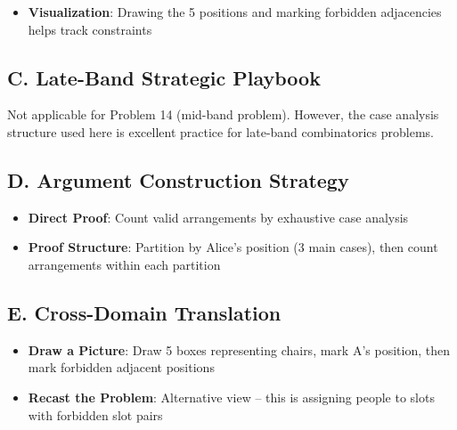 \documentclass[]{article}
\begin{document}
\begin{strategicbox}
\begin{itemize}[leftmargin=*]
    \item \textbf{Visualization}: Drawing the 5 positions and marking forbidden adjacencies helps track constraints
\end{itemize}

\subsection*{C. Late-Band Strategic Playbook}
Not applicable for Problem 14 (mid-band problem). However, the case analysis structure used here is excellent practice for late-band combinatorics problems.

\subsection*{D. Argument Construction Strategy}
\begin{itemize}[leftmargin=*]
    \item \textbf{Direct Proof}: Count valid arrangements by exhaustive case analysis
    \item \textbf{Proof Structure}: Partition by Alice's position (3 main cases), then count arrangements within each partition
\end{itemize}

\subsection*{E. Cross-Domain Translation}
\begin{itemize}[leftmargin=*]
    \item \textbf{Draw a Picture}: Draw 5 boxes representing chairs, mark A's position, then mark forbidden adjacent positions
    \item \textbf{Recast the Problem}: Alternative view -- this is assigning people to slots with forbidden slot pairs
\end{itemize}
\end{strategicbox}
\end{document}
